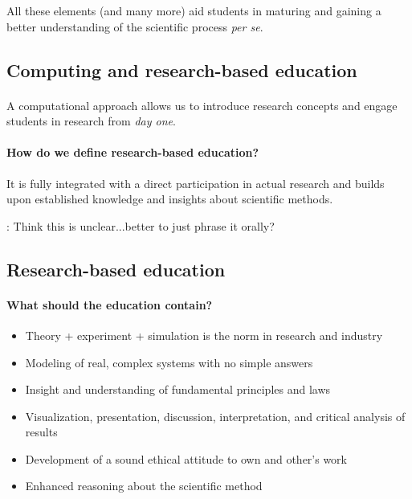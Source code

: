 \documentclass[%
<<<<<<< HEAD
oneside,                 %
final,                   %
=======
twoside,                 %
final,                   %
>>>>>>> 5fc06d357468ca5ec59d2d3ed0179709275f8f00
10pt]{article}
\newcommand{\shortinlinecomment}[3]{{\color{red}{\bf #1}: #2}}
\begin{document}
\noindent
All these elements (and many more) aid students in maturing and gaining a better understanding of the scientific process \emph{per se}.







\subsection*{Computing and research-based education}


\paragraph{}
A computational approach allows us to introduce research concepts and engage students in research from \emph{day one}.



\paragraph{How do we define research-based education?}
It is fully integrated with a direct participation in actual research and builds upon established
knowledge and insights about scientific methods.

\shortinlinecomment{hpl 1}{ Think this is unclear...better to just phrase it orally? }{ Think this is unclear...better }





\subsection*{Research-based education}


\paragraph{What should the education contain?}

\begin{itemize}
\item Theory + experiment + simulation is the norm in research and industry

\item Modeling of real, complex systems with no simple answers

\item Insight and understanding of fundamental principles and laws

\item Visualization, presentation, discussion, interpretation, and critical analysis of results

\item Development of a sound ethical attitude to own and other's work

\item Enhanced reasoning about the scientific method
\end{itemize}
\end{document}
